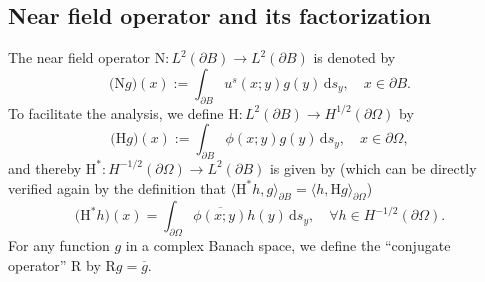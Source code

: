 \documentclass[final]{siamltex}
\newcommand{\ind}{\,\mbox{d}}
\begin{document}
\subsection{Near field operator and its factorization}
The near field operator $\mathrm{N}: L^2(\partial B) \to L^2(\partial B)$ is denoted by
\begin{equation}
\big( \mathrm{N} g \big) (x):= \int_{\partial B} u^s(x;y) g(y) \ind s_y, \quad  x \in \partial B.
\end{equation}
To facilitate the analysis, we define $ \mathrm{H}:L^2(\partial B) \to H^{1/2}(\partial \Omega)$ by
\begin{equation} \label{obstacle H def}
\big( \mathrm{H} g \big) (x):= \int_{\partial B} \phi(x;y) g(y) \ind s_y, \quad  x \in \partial \Omega,
\end{equation}
and thereby  $ \mathrm{H}^*:H^{-1/2}(\partial \Omega) \to L^2(\partial B) $ is given by (which can be directly verified again by the definition that $\langle \mathrm{H}^* h,g\rangle_{\partial B}=\langle h,\mathrm{H}g\rangle_{\partial \Omega}$)
\begin{equation} \label{obstacle H* def}
\big(\mathrm{H}^* h \big)(x) =  \int_{\partial \Omega} \overline{\phi(x;y)} h(y)  \ind s_y, \quad \forall h \in H^{-1/2}(\partial \Omega).
\end{equation}
For any function $g$ in a complex Banach space, we define the ``conjugate operator'' $\mathrm{R}$ by $\mathrm{R} g = \overline{g}$.
\end{document}
